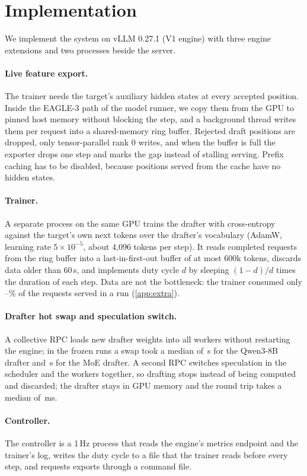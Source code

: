 \section{Implementation}\label{sec:system}

We implement the system on vLLM 0.27.1 (V1 engine) with three engine extensions and two processes beside the server.

\paragraph{Live feature export.} The trainer needs the target's auxiliary hidden states at every accepted position. Inside the EAGLE-3 path of the model runner, we copy them from the GPU to pinned host memory without blocking the step, and a background thread writes them per request into a shared-memory ring buffer. Rejected draft positions are dropped, only tensor-parallel rank 0 writes, and when the buffer is full the exporter drops one step and marks the gap instead of stalling serving. Prefix caching has to be disabled, because positions served from the cache have no hidden states.

\paragraph{Trainer.} A separate process on the same GPU trains the drafter with cross-entropy against the target's own next tokens over the drafter's vocabulary (AdamW, learning rate $5\times10^{-5}$, about 4{,}096 tokens per step). It reads completed requests from the ring buffer into a last-in-first-out buffer of at most 600k tokens, discards data older than 60\,s, and implements duty cycle $d$ by sleeping $(1-d)/d$ times the duration of each step. Data are not the bottleneck: the trainer consumed only --\% of the requests served in a run (\cref{app:extra}).

\paragraph{Drafter hot swap and speculation switch.} A collective RPC loads new drafter weights into all workers without restarting the engine; in the frozen runs a swap took a median of \,s for the Qwen3-8B drafter and \,s for the MoE drafter. A second RPC switches speculation in the scheduler and the workers together, so drafting stops instead of being computed and discarded; the drafter stays in GPU memory and the round trip takes a median of \,ms.

\paragraph{Controller.} The controller is a 1\,Hz process that reads the engine's metrics endpoint and the trainer's log, writes the duty cycle to a file that the trainer reads before every step, and requests exports through a command file.
